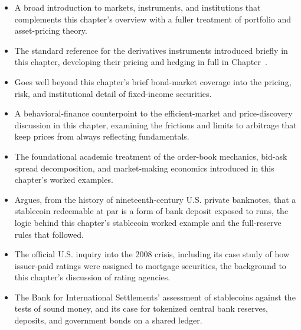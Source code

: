 \documentclass[../ai_in_finance]{subfiles}
\begin{document}
\begin{itemize}
    \item {} A broad introduction to markets, instruments, and institutions that complements this chapter's overview with a fuller treatment of portfolio and asset-pricing theory.
    \item {} The standard reference for the derivatives instruments introduced briefly in this chapter, developing their pricing and hedging in full in Chapter~.
    \item {} Goes well beyond this chapter's brief bond-market coverage into the pricing, risk, and institutional detail of fixed-income securities.
    \item {} A behavioral-finance counterpoint to the efficient-market and price-discovery discussion in this chapter, examining the frictions and limits to arbitrage that keep prices from always reflecting fundamentals.
    \item {} The foundational academic treatment of the order-book mechanics, bid-ask spread decomposition, and market-making economics introduced in this chapter's worked examples.
    \item {} Argues, from the history of nineteenth-century U.S. private banknotes, that a stablecoin redeemable at par is a form of bank deposit exposed to runs, the logic behind this chapter's stablecoin worked example and the full-reserve rules that followed.
    \item {} The official U.S. inquiry into the 2008 crisis, including its case study of how issuer-paid ratings were assigned to mortgage securities, the background to this chapter's discussion of rating agencies.
    \item {} The Bank for International Settlements' assessment of stablecoins against the tests of sound money, and its case for tokenized central bank reserves, deposits, and government bonds on a shared ledger.
\end{itemize}
\end{document}
